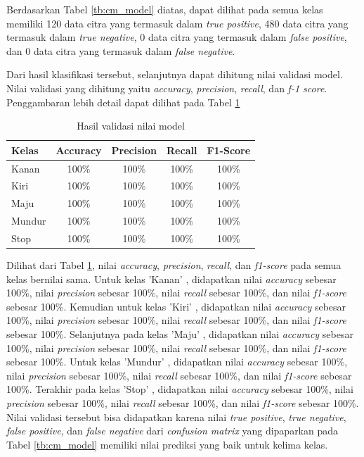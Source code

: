 Berdasarkan Tabel \ref{tb:cm_model} diatas, dapat dilihat pada semua kelas memiliki 120 data citra yang termasuk dalam \emph{true positive}, 480 data citra yang termasuk dalam \emph{true negative}, 0 data citra yang termasuk dalam \emph{false positive}, dan 0 data citra yang termasuk dalam \emph{false negative}. 

Dari hasil klasifikasi tersebut, selanjutnya dapat dihitung nilai validasi model. Nilai validasi yang dihitung yaitu \emph{accuracy}, \emph{precision}, \emph{recall}, dan \emph{f-1 score}. Penggambaran lebih detail dapat dilihat pada Tabel \ref{tb:vs_model}

\begin{longtable}{|l|c|c|c|c|}
  \caption{Hasil validasi nilai model}
  \label{tb:vs_model} \\
  \hline
  \rowcolor[HTML]{C0C0C0} 
  \textbf{Kelas} & \textbf{Accuracy} & \textbf{Precision} & \textbf{Recall} & \textbf{F1-Score} \\ \hline
  Kanan    & 100\%            & 100\%             & 100\%           & 100\%            \\ \hline
  Kiri     & 100\%          & 100\%           & 100\%           & 100\%           \\ \hline
  Maju      & 100\%          & 100\%           & 100\%          & 100\%          \\ \hline
  Mundur     & 100\%            & 100\%             & 100\%           & 100\%            \\ \hline
  Stop  & 100\%            & 100\%             & 100\%           & 100\%            \\ \hline
\end{longtable}

Dilihat dari Tabel \ref{tb:vs_model}, nilai \emph{accuracy}, \emph{precision}, \emph{recall}, dan \emph{f1-score} pada semua kelas bernilai sama. Untuk kelas 'Kanan' , didapatkan nilai \emph{accuracy} sebesar 100\%, nilai \emph{precision} sebesar 100\%, nilai \emph{recall} sebesar 100\%, dan nilai \emph{f1-score} sebesar 100\%. Kemudian untuk kelas 'Kiri' , didapatkan nilai \emph{accuracy} sebesar 100\%, nilai \emph{precision} sebesar 100\%, nilai \emph{recall} sebesar 100\%, dan nilai \emph{f1-score} sebesar 100\%. Selanjutnya pada kelas 'Maju' , didapatkan nilai \emph{accuracy} sebesar 100\%, nilai \emph{precision} sebesar 100\%, nilai \emph{recall} sebesar 100\%, dan nilai \emph{f1-score} sebesar 100\%. Untuk kelas 'Mundur' , didapatkan nilai \emph{accuracy} sebesar 100\%, nilai \emph{precision} sebesar 100\%, nilai \emph{recall} sebesar 100\%, dan nilai \emph{f1-score} sebesar 100\%. Terakhir pada kelas 'Stop' , didapatkan nilai \emph{accuracy} sebesar 100\%, nilai \emph{precision} sebesar 100\%, nilai \emph{recall} sebesar 100\%, dan nilai \emph{f1-score} sebesar 100\%. Nilai validasi tersebut bisa didapatkan karena nilai \emph{true positive}, \emph{true negative}, \emph{false positive}, dan \emph{false negative} dari \emph{confusion matrix} yang dipaparkan pada Tabel \ref{tb:cm_model} memiliki nilai prediksi yang baik untuk kelima kelas.

